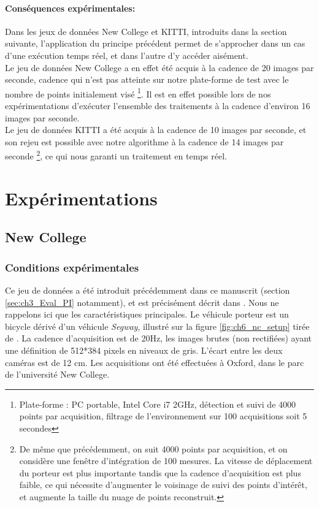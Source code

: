 \paragraph{Conséquences expérimentales:\\}
Dans les jeux de données \og New College\fg{} et \og KITTI\fg{}, introduits dans la section suivante, l'application du principe précédent permet de s'approcher dans un cas d'une exécution temps réel, et dans l'autre d'y accéder aisément.\\
Le jeu de données \og New College\fg{} a en effet été acquis à la cadence de 20 images par seconde, cadence qui n'est pas atteinte sur notre plate-forme de test avec le nombre de points initialement visé \footnote{Plate-forme : PC portable, Intel Core i7 2GHz, détection et suivi de 4000 points par acquisition, filtrage de l'environnement sur 100 acquisitions soit 5 secondes}. Il est en effet possible lors de nos expérimentations d'exécuter l'ensemble des traitements à la cadence d'environ 16 images par seconde.\\
Le jeu de données KITTI a été acquis à la cadence de 10 images par seconde, et son rejeu est possible avec notre algorithme à la cadence de 14 images par seconde \footnote{De même que précédemment, on suit 4000 points par acquisition, et on considère une fenêtre d'intégration de 100 mesures. La vitesse de déplacement du porteur est plus importante tandis que la cadence d'acquisition est plus faible, ce qui nécessite d'augmenter le voisinage de suivi des points d'intérêt, et augmente la taille du nuage de points reconstruit.}, ce qui nous garanti un traitement en temps réel.

\section{Expérimentations} 
\subsection{New College}
\subsubsection{Conditions expérimentales}
Ce jeu de données a été introduit précédemment dans ce manuscrit (section \ref{sec:ch3_Eval_PI} notamment), et est précisément décrit dans \cite{Smith2009}. Nous ne rappelons ici que les caractéristiques principales. Le véhicule porteur est un bicycle dérivé d'un véhicule \emph{Segway}, illustré sur la figure \ref{fig:ch6_nc_setup} tirée de \cite{Smith2009}. La cadence d'acquisition est de 20Hz, les images brutes (non rectifiées) ayant une définition de 512*384 pixels en niveaux de gris. L'écart entre les deux caméras est de 12 cm. Les acquisitions ont été effectuées à Oxford, dans le parc de l'université \og New College\fg{}.


